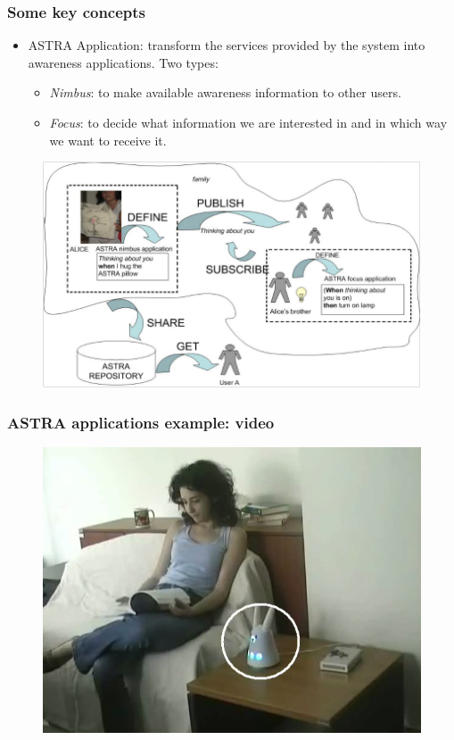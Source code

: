 \begin{frame}
\frametitle{Some key concepts} 

\begin{itemize}
  \item ASTRA Application: transform the services provided by the system
into awareness applications. Two types:
	\begin{itemize}
  		\item \emph{Nimbus}: to make available awareness information to other users.
  		\item \emph{Focus}: to decide what information
			we are interested in and in which way we want to receive it.
	\end{itemize} 

\end{itemize}


 \begin{figure}
 	\includegraphics[scale=0.22]{img/astra-applications-schema.png}
 \end{figure}


\end{frame}

\begin{frame}
\frametitle{ASTRA applications example: video} 


 \begin{figure}
 	\includegraphics[scale=0.35]{img/video-screenshot.png}
 \end{figure}


\end{frame}

